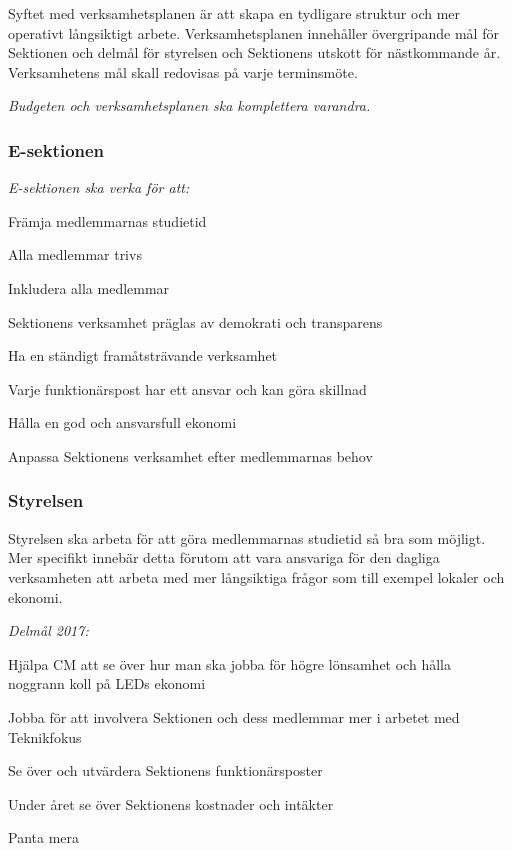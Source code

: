 \documentclass[../_main/handlingar.tex]{subfiles}
\begin{document}
Syftet med verksamhetsplanen är att skapa en tydligare struktur och mer operativt långsiktigt arbete. Verksamhetsplanen innehåller övergripande mål för Sektionen och delmål för styrelsen och Sektionens utskott för nästkommande år. Verksamhetens mål skall redovisas på varje terminsmöte.

\emph{Budgeten och verksamhetsplanen ska komplettera varandra.}

\subsubsection*{E-sektionen}
\emph{E-sektionen ska verka för att:}
\begin{dashlist}
    \item Främja medlemmarnas studietid
    \item Alla medlemmar trivs
    \item Inkludera alla medlemmar
    \item Sektionens verksamhet präglas av demokrati och transparens
    \item Ha en ständigt framåtsträvande verksamhet
    \item Varje funktionärspost har ett ansvar och kan göra skillnad
    \item Hålla en god och ansvarsfull ekonomi
    \item Anpassa Sektionens verksamhet efter medlemmarnas behov
\end{dashlist}

\subsubsection*{Styrelsen}
Styrelsen ska arbeta för att göra medlemmarnas studietid så bra som möjligt. Mer specifikt innebär detta förutom att vara ansvariga för den dagliga verksamheten att arbeta med mer långsiktiga frågor som till exempel lokaler och ekonomi.

\emph{Delmål 2017:}
\begin{dashlist}
    \item Hjälpa CM att se över hur man ska jobba för högre lönsamhet och hålla noggrann koll på LEDs ekonomi
    \item Jobba för att involvera Sektionen och dess medlemmar mer i arbetet med Teknikfokus
    \item Se över och utvärdera Sektionens funktionärsposter
    \item Under året se över Sektionens kostnader och intäkter
    \item Panta mera \scalebox{0.5}{\recycle}
\end{dashlist}
\end{document}
